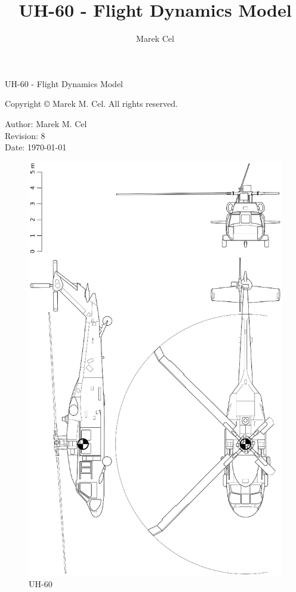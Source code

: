 \documentclass[12pt,a4paper]{article}
\title{UH-60 - Flight Dynamics Model}
\author{Marek Cel}
\date{}
\begin{document}
  
  \begin{titlepage}
    \centering
    {\huge UH-60 - Flight Dynamics Model\par}
  \end{titlepage}
  

  \noindent Copyright \copyright{} \the\year{} Marek M. Cel. All rights reserved.

  \noindent Author: Marek M. Cel \\
  Revision: 8 \\
  Date: \today

  
  
  \clearpage
  
  \begin{figure}[p]
    \centering
    \includegraphics[width=160mm]{eps/uh60_3view.eps}
    \caption{UH-60}
  \end{figure}
\end{document}
